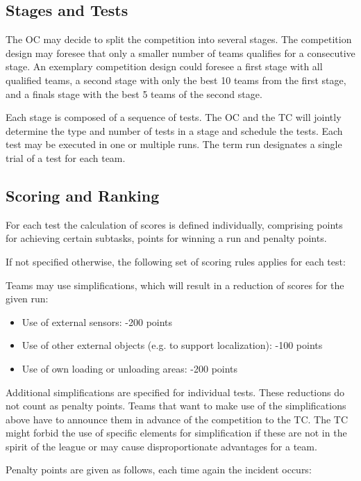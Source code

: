 \subsection{Stages and Tests}
The OC may decide to split the competition into several stages. The competition design may foresee that only a smaller number of teams qualifies for a consecutive stage. An exemplary competition design could foresee a first stage with all qualified teams, a second stage with only the best 10 teams from the first stage, and a finals stage with the best 5 teams of the second stage.
\par
Each stage is composed of a sequence of tests. The OC and the TC will jointly determine the type and number of tests in a stage and schedule the tests.
Each test may be executed in one or multiple runs. The term run designates a single trial of a test for each team.

\subsection{Scoring and Ranking}
For each test the calculation of scores is defined individually, comprising points for achieving certain subtasks, points for winning a run and penalty points.
\par
If not specified otherwise, the following set of scoring rules applies for each test:
\par
Teams may use simplifications, which will result in a reduction of scores for the given run:

\begin{itemize}
	\item Use of external sensors: \hfill -200 points
	\item Use of other external objects (e.g. to support localization): \hfill -100 points
	\item Use of own loading or unloading areas: \hfill -200 points
\end{itemize}

Additional simplifications are specified for individual tests. These reductions do not count as penalty points. Teams that want to make use of the simplifications above have to announce them in advance of the competition to the TC. The TC might forbid the use of specific elements for simplification if these are not in the spirit of the league or may cause disproportionate advantages for a team.
\par
Penalty points are given as follows, each time again the incident occurs:

